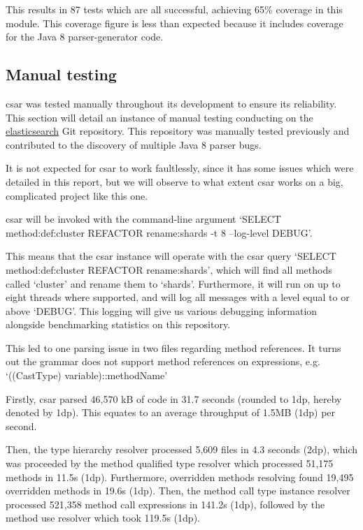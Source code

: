 \documentclass[12pt, letterpaper]{article}
\begin{document}
This results in 87 tests which are all successful, achieving 65\% coverage in this module.
This coverage figure is less than expected because it includes coverage for the Java 8 parser-generator code.

\subsection{Manual testing}
csar was tested manually throughout its development to ensure its reliability.
This section will detail an instance of manual testing conducting on the \href{https://github.com/elastic/elasticsearch}{elasticsearch} Git repository.
This repository was manually tested previously and contributed to the discovery of multiple Java 8 parser bugs.

It is not expected for csar to work faultlessly, since it has some issues which were detailed in this report, but we will observe to what extent csar works on a big, complicated project like this one.

csar will be invoked with the command-line argument `SELECT method:def:cluster REFACTOR rename:shards -t 8 --log-level DEBUG'.

This means that the csar instance will operate with the csar query `SELECT method:def:cluster REFACTOR rename:shards', which will find all methods called `cluster' and rename them to `shards'.
Furthermore, it will run on up to eight threads where supported, and will log all messages with a level equal to or above `DEBUG'.
This logging will give us various debugging information alongside benchmarking statistics on this repository.

This led to one parsing issue in two files regarding method references.
It turns out the grammar does not support method references on expressions, e.g. `((CastType) variable)::methodName'

Firstly, csar parsed 46,570 kB of code in 31.7 seconds (rounded to 1dp, hereby denoted by 1dp).
This equates to an average throughput of 1.5MB (1dp) per second.

Then, the type hierarchy resolver processed 5,609 files in 4.3 seconds (2dp), which was proceeded by the method qualified type resolver which processed 51,175 methods in 11.5s (1dp).
Furthermore, overridden methods resolving found 19,495 overridden methods in 19.6s (1dp).
Then, the method call type instance resolver processed 521,358 method call expressions in 141.2s (1dp), followed by the method use resolver which took 119.5s (1dp).
\end{document}
